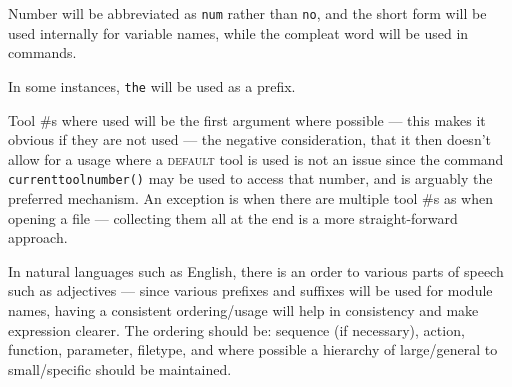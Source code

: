 \documentclass{ltxdoc}
\begin{document}

Number will be abbreviated as \verb|num| rather than \verb|no|, and the short form will be used internally for variable names, while the compleat word will be used in commands.

In some instances, \verb|the| will be used as a prefix.

Tool \#s where used will be the first argument where possible --- this makes it obvious if they are not used --- the negative consideration, that it then doesn't allow for a usage where a \textsc{default} tool is used is not an issue since the command \verb|currenttoolnumber()| may be used to access that number, and is arguably the preferred mechanism. An exception is when there are multiple tool \#s as when opening a file --- collecting them all at the end is a more straight-forward approach.

In natural languages such as English, there is an order to various parts of speech such as adjectives 
--- since various prefixes and suffixes will be used for module names, having a consistent ordering/usage will help in consistency and make expression clearer. The ordering should be: sequence (if necessary), action, function, parameter, filetype, and where possible a hierarchy of large/general to small/specific should be maintained.
\end{document}
